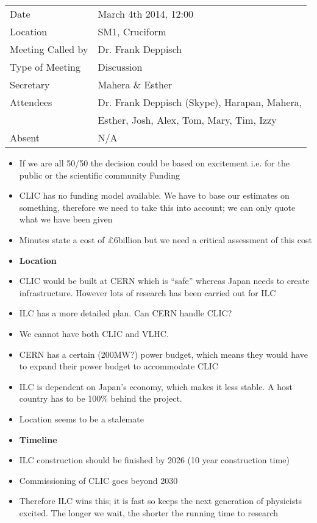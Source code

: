 \begin{tabular}{l l}
  Date & March 4th 2014, 12:00 \\
  Location & SM1, Cruciform \\
  Meeting Called by & Dr. Frank Deppisch \\
  Type of Meeting & Discussion \\
  Secretary & Mahera \& Esther \\
  Attendees & Dr. Frank Deppisch (Skype), Harapan, Mahera, \\
  &  Esther, Josh, Alex, Tom, Mary, Tim, Izzy \\
  Absent & N/A \\  
\end{tabular}

\begin{itemize}
\item If we are all 50/50 the decision could be based on excitement i.e. for the public or the scientific community
Funding
\item  CLIC has no funding model available. We have to base our estimates on something, therefore we need to take this into account; we can only quote what we have been given
\item  Minutes state a cost of £6billion but we need a critical assessment of this cost
\item \textbf{Location}
\item  CLIC would be built at CERN which is “safe” whereas Japan needs to create infrastructure. However lots of research has been carried out for ILC
\item  ILC has a more detailed plan. Can CERN handle CLIC?
\item  We cannot have both CLIC and VLHC.
\item  CERN has a certain (200MW?) power budget, which means they would have to expand their power budget to accommodate CLIC
\item  ILC is dependent on Japan’s economy, which makes it less stable. A host country has to be 100\% behind the project.
\item  Location seems to be a stalemate
\item \textbf{Timeline}
\item  ILC construction should be finished by 2026 (10 year construction time)
\item  Commissioning of CLIC goes beyond 2030
\item  Therefore ILC wins this; it is fast so keeps the next generation of physicists excited. The longer we wait, the shorter the running time to research

\end{itemize}
